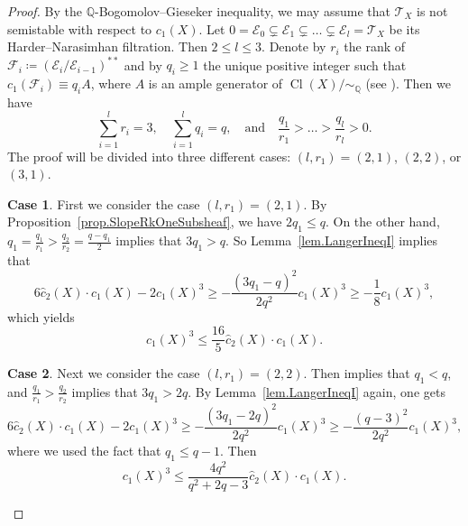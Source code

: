 \documentclass[12pt,twoside]{amsart}
\DeclareMathOperator{\Cl}{Cl}
\theoremstyle{definition}
\newtheorem{case}{Case}
\begin{document}
	\begin{proof}
		By the $\mathbb{Q}$-Bogomolov--Gieseker inequality, we may assume that $\mathcal{T}_X$ is not semistable with respect to $c_1(X)$. Let $0=\mathcal{E}_0\subsetneq \mathcal{E}_1\subsetneq \dots \subsetneq \mathcal{E}_l=\mathcal{T}_X$ be its Harder--Narasimhan filtration. Then $2\leq l\leq 3$. Denote by $r_i$ the rank of $\mathcal{F}_i\coloneqq (\mathcal{E}_i/\mathcal{E}_{i-1})^{**}$ and by $q_i\geq 1$ the unique positive integer such that $c_1(\mathcal{F}_i)\equiv q_i A$, where $A$ is an ample generator of $\Cl (X)/\sim_{\mathbb{Q}}$ (see \cite[Proposition~3.6]{LiuLiu2023}). Then we have
		\[
		\sum_{i=1}^l r_i=3,\quad \sum_{i=1}^l q_i = q, \quad \text{and}\quad \frac{q_1}{r_1} > \dots > \frac{q_l}{r_l}>0.
		\]
		The proof will be divided into three different cases: $(l,r_1)=(2,1)$, $(2,2)$, or $(3,1)$.
		
		\begin{case}
			First we consider the case $(l,r_1)=(2,1)$. By Proposition~\ref{prop.SlopeRkOneSubsheaf}, we have $2q_1\leq q$. On the other hand, $q_1=\frac{q_1}{r_1}>\frac{q_2}{r_2}=\frac{q-q_1}{2}$ implies that $3q_1>q$. So Lemma~\ref{lem.LangerIneqI} implies that
			\[
			6\hat{c}_2(X)\cdot c_1(X) - 2 c_1(X)^3 
			\geq - \frac{(3q_1-q)^2}{2q^2} c_1(X)^3 \geq - \frac{1}{8} c_1(X)^3,
			\]
			which yields
			\[
			c_1(X)^3 \leq \frac{16}{5} \hat{c}_2(X)\cdot c_1(X).
			\] 
		\end{case}
		
		\begin{case}
			Next we consider the case $(l,r_1)=(2,2)$. Then \cite[Proposition~3.6]{LiuLiu2023} implies that $q_1<q$, and $\frac{q_1}{r_1}>\frac{q_2}{r_2}$ implies that $3q_1>2q$. By Lemma~\ref{lem.LangerIneqI} again, one gets
			\[
			6 \hat{c}_2(X)\cdot c_1(X) - 2c_1(X)^3
			\geq -\frac{(3q_1-2q)^2}{2q^2} c_1(X)^3 \geq -\frac{(q-3)^2}{2q^2} c_1(X)^3,
			\]
 where we used the fact that $q_1\leq q-1$. 
Then 
			\[
			c_1(X)^3 \leq \frac{4q^2}{q^2 + 2q- 3} \hat{c}_2(X)\cdot c_1(X).
			\]
		\end{case}
		

\end{proof}
\end{document}

